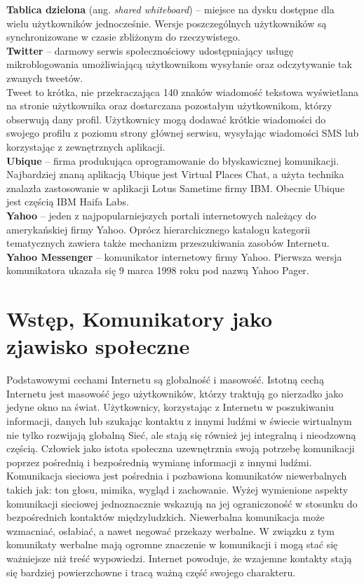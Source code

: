 \documentclass[a4paper,12pt]{article}
\begin{document}
\noindent\textbf{Tablica dzielona} (ang. \textit{shared whiteboard}) -- miejsce na dysku dostępne dla wielu użytkowników jednocześnie. Wersje poszczególnych użytkowników są synchronizowane w czasie zbliżonym do rzeczywistego.\\

\noindent\textbf{Twitter} -- darmowy serwis społecznościowy udostępniający usługę mikroblogowania umożliwiającą użytkownikom wysyłanie oraz odczytywanie tak zwanych tweetów.\\ Tweet to krótka, nie przekraczająca 140 znaków wiadomość tekstowa wyświetlana na stronie użytkownika oraz dostarczana pozostałym użytkownikom, którzy obserwują dany profil. Użytkownicy mogą dodawać krótkie wiadomości do swojego profilu z poziomu strony głównej serwisu, wysyłając wiadomości SMS lub korzystając z zewnętrznych aplikacji.\\

\noindent\textbf{Ubique} -- firma produkująca oprogramowanie do błyskawicznej komunikacji. Najbardziej znaną aplikacją Ubique jest Virtual Places Chat, a użyta technika znalazła zastosowanie w aplikacji Lotus Sametime firmy IBM. Obecnie Ubique jest częścią IBM Haifa Labs.\\

\noindent\textbf{Yahoo} -- jeden z najpopularniejszych portali internetowych należący do amerykańskiej firmy Yahoo. Oprócz hierarchicznego katalogu kategorii tematycznych zawiera także mechanizm przeszukiwania zasobów Internetu.\\

\noindent\textbf{Yahoo Messenger} -- komunikator internetowy firmy Yahoo. Pierwsza wersja komunikatora ukazała się 9 marca 1998 roku pod nazwą Yahoo Pager.\\

\section[Wstęp, Komunikatory jako zjawisko społeczne]{Wstęp, Komunikatory jako zjawisko społeczne}
Podstawowymi cechami Internetu są globalność i masowość.
Istotną cechą Internetu jest masowość jego użytkowników, którzy traktują go nierzadko jako jedyne okno na świat.
Użytkownicy, korzystając z Internetu w poszukiwaniu informacji, danych lub szukając kontaktu z innymi ludźmi w świecie wirtualnym nie tylko rozwijają globalną Sieć, ale stają się również jej integralną i nieodzowną częścią.
Człowiek jako istota społeczna uzewnętrznia swoją potrzebę komunikacji poprzez pośrednią i bezpośrednią wymianę informacji z innymi ludźmi. Komunikacja sieciowa jest pośrednia i pozbawiona komunikatów niewerbalnych takich jak:
ton głosu, mimika, wygląd i zachowanie. Wyżej wymienione aspekty komunikacji sieciowej jednoznacznie wskazują na jej ograniczoność w stosunku do bezpośrednich kontaktów międzyludzkich. Niewerbalna komunikacja może wzmacniać, osłabiać, a nawet negować przekazy werbalne. W związku z tym komunikaty werbalne mają ogromne znaczenie w komunikacji i mogą stać się ważniejsze niż treść wypowiedzi. Internet powoduje, że wzajemne kontakty stają się bardziej powierzchowne i tracą ważną część swojego charakteru.
\end{document}
